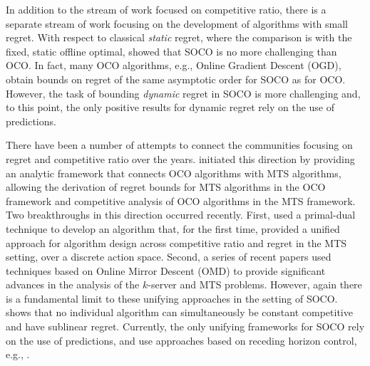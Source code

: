 In addition to the stream of work focused on competitive ratio, there is a separate stream of work focusing on the development of algorithms with small regret.  With respect to classical \emph{static} regret, where the comparison is with the  fixed, static offline optimal, \cite{andrew2013} showed that SOCO is no more challenging than OCO.  In fact, many OCO algorithms, e.g., Online Gradient Descent (OGD), obtain bounds on regret of the same asymptotic order for SOCO as for OCO.  However, the task of bounding \emph{dynamic} regret in SOCO is more challenging and, to this point, the only positive results for dynamic regret rely on the use of predictions.  %

There have been a number of attempts to connect the communities focusing on regret and competitive ratio over the years.  \cite{Blum2000} initiated this direction by providing an analytic framework that connects OCO algorithms with MTS algorithms, allowing the derivation of regret bounds for MTS algorithms in the OCO framework and competitive analysis of OCO algorithms in the MTS framework.  Two breakthroughs in this direction occurred recently.  First, \cite{buchbinder2012unified} used a primal-dual technique to develop an algorithm that, for the first time, provided a unified approach for algorithm design across competitive ratio and regret in the MTS setting, over a discrete action space. Second, a series of recent papers \citep{abernethy2010regularization, buchbinder2014competitive, bubeck2017} used techniques based on Online Mirror Descent (OMD) to provide significant advances in the analysis of the $k$-server and MTS problems. However, again there is a fundamental limit to these unifying approaches in the setting of SOCO. \cite{andrew2013} shows that no individual algorithm can simultaneously be constant competitive and have sublinear regret.  Currently, the only unifying frameworks for SOCO rely on the use of predictions, and use approaches based on receding horizon control, e.g., \cite{chen2015,badiei2015online, chen2016,li2018online}. 

